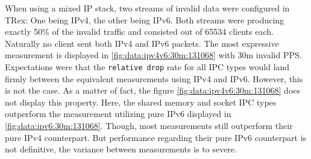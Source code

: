 When using a mixed IP stack, two streams of invalid data were configured in TRex: One being IPv4, the other being IPv6.
Both streams were producing exactly 50\% of the invalid traffic and consisted out of 65534 clients each.
Naturally no client sent both IPv4 and IPv6 packets.
The most expressive measurement is displayed in \ref{fig:data:ipv4v6:30m:131068} with 30m invalid PPS.
Expectations were that the \texttt{relative drop} rate for all IPC types would land firmly between the equivalent measurements using IPv4 and IPv6.
However, this is not the case.
As a matter of fact, the figure \ref{fig:data:ipv4v6:30m:131068} does not display this property.
Here, the shared memory and socket IPC types outperform the measurement utilizing pure IPv6 displayed in \ref{fig:data:ipv6:30m:131068}.
Though, most measurements still outperform their pure IPv4 counterpart.
But performance regarding their pure IPv6 counterpart is not definitive, the variance between measurements is to severe.

